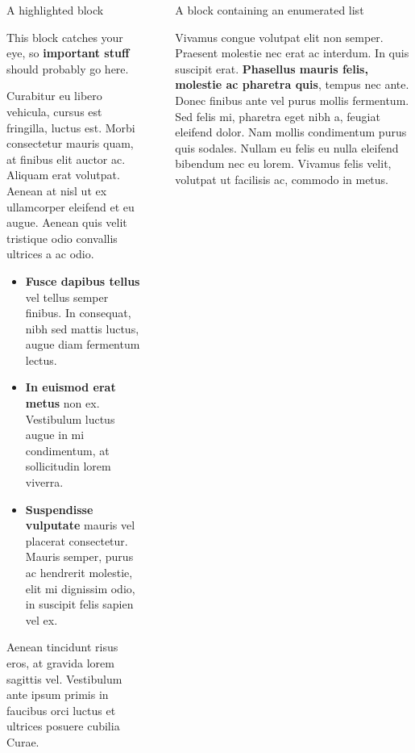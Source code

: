 \documentclass[final]{beamer}
\newlength{\sepwidth}
\newlength{\colwidth}
\newcommand{\separatorcolumn}{\begin{column}{\sepwidth}\end{column}}
\begin{document}
\begin{frame}[t]
\begin{columns}[t]
\begin{column}{\colwidth}
      \begin{alertblock}{A highlighted block}
        
        This block catches your eye, so \textbf{important stuff} should probably go
        here.
        
        Curabitur eu libero vehicula, cursus est fringilla, luctus est. Morbi
        consectetur mauris quam, at finibus elit auctor ac. Aliquam erat volutpat.
        Aenean at nisl ut ex ullamcorper eleifend et eu augue. Aenean quis velit
        tristique odio convallis ultrices a ac odio.
        
        \begin{itemize}
          \item \textbf{Fusce dapibus tellus} vel tellus semper finibus. In
                consequat, nibh sed mattis luctus, augue diam fermentum lectus.
          \item \textbf{In euismod erat metus} non ex. Vestibulum luctus augue in
                mi condimentum, at sollicitudin lorem viverra.
          \item \textbf{Suspendisse vulputate} mauris vel placerat consectetur.
                Mauris semper, purus ac hendrerit molestie, elit mi dignissim odio, in
                suscipit felis sapien vel ex.
        \end{itemize}
        
        Aenean tincidunt risus eros, at gravida lorem sagittis vel. Vestibulum ante
        ipsum primis in faucibus orci luctus et ultrices posuere cubilia Curae.
        
      \end{alertblock}
      
    \end{column}
    
    \separatorcolumn
    
    \begin{column}{\colwidth}
      
      \begin{block}{A block containing an enumerated list}
        
        Vivamus congue volutpat elit non semper. Praesent molestie nec erat ac
        interdum. In quis suscipit erat. \textbf{Phasellus mauris felis, molestie
          ac pharetra quis}, tempus nec ante. Donec finibus ante vel purus mollis
        fermentum. Sed felis mi, pharetra eget nibh a, feugiat eleifend dolor. Nam
        mollis condimentum purus quis sodales. Nullam eu felis eu nulla eleifend
        bibendum nec eu lorem. Vivamus felis velit, volutpat ut facilisis ac,
        commodo in metus.
        

\end{block}
\end{column}
\end{columns}
\end{frame}
\end{document}
